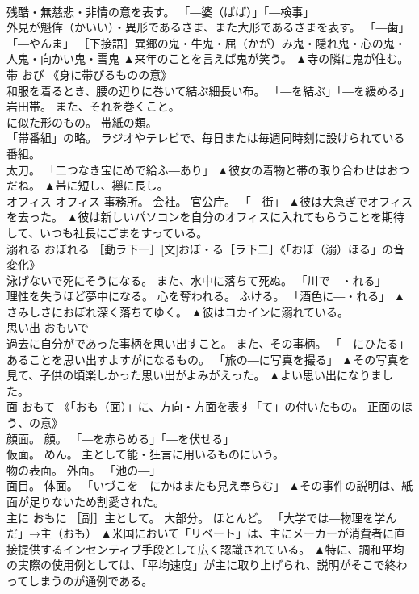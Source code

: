 \documentclass[8pt]{extreport}
\begin{document}
\begin{CJK}{UTF8}{min}
\\	残酷・無慈悲・非情の意を表す。 「―婆（ばば）」「―検事」 
\\	外見が魁偉（かいい）・異形であるさま、また大形であるさまを表す。 「―歯」「―やんま」 ［下接語］異郷の鬼・牛鬼・屈（かが）み鬼・隠れ鬼・心の鬼・人鬼・向かい鬼・雪鬼	▲来年のことを言えば鬼が笑う。 ▲寺の隣に鬼が住む。
\\	帯	おび	《身に帯びるものの意》 
\\	和服を着るとき、腰の辺りに巻いて結ぶ細長い布。 「―を結ぶ」「―を緩める」 
\\	岩田帯。 また、それを巻くこと。 
\\	に似た形のもの。 帯紙の類。 
\\	「帯番組」の略。 ラジオやテレビで、毎日または毎週同時刻に設けられている番組。 
\\	太刀。 「二つなき宝にめで給ふ―あり」	▲彼女の着物と帯の取り合わせはおつだね。 ▲帯に短し、襷に長し。
\\	オフィス	オフィス	事務所。 会社。 官公庁。 「―街」	▲彼は大急ぎでオフィスを去った。 ▲彼は新しいパソコンを自分のオフィスに入れてもらうことを期待して、いつも社長にごまをすっている。
\\	溺れる	おぼれる	［動ラ下一］[文]おぼ・る［ラ下二］《「おぼ（溺）ほる」の音変化》 
\\	泳げないで死にそうになる。 また、水中に落ちて死ぬ。 「川で―・れる」 
\\	理性を失うほど夢中になる。 心を奪われる。 ふける。 「酒色に―・れる」	▲さみしさにおぼれ深く落ちてゆく。 ▲彼はコカインに溺れている。
\\	思い出	おもいで	
\\	過去に自分がであった事柄を思い出すこと。 また、その事柄。 「―にひたる」 
\\	あることを思い出すよすがになるもの。 「旅の―に写真を撮る」	▲その写真を見て、子供の頃楽しかった思い出がよみがえった。 ▲よい思い出になりました。
\\	面	おもて	《「おも（面）」に、方向・方面を表す「て」の付いたもの。 正面のほう、の意》 
\\	顔面。 顔。 「―を赤らめる」「―を伏せる」 
\\	仮面。 めん。 主として能・狂言に用いるものにいう。 
\\	物の表面。 外面。 「池の―」 
\\	面目。 体面。 「いづこを―にかはまたも見え奉らむ」	▲その事件の説明は、紙面が足りないため割愛された。
\\	主に	おもに	［副］主として。 大部分。 ほとんど。 「大学では―物理を学んだ」→主（おも）	▲米国において「リベート」は、主にメーカーが消費者に直接提供するインセンティブ手段として広く認識されている。 ▲特に、調和平均の実際の使用例としては、「平均速度」が主に取り上げられ、説明がそこで終わってしまうのが通例である。

\end{CJK}
\end{document}
